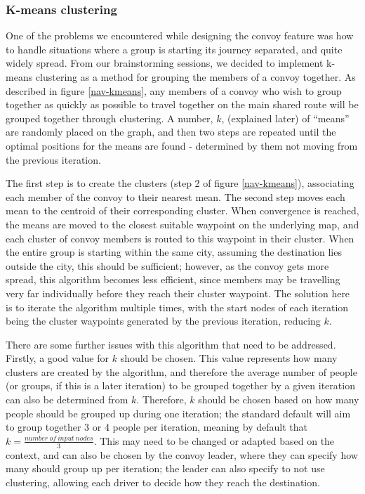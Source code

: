 \documentclass{article}
\begin{document}
\subsubsection{K-means clustering}\label{sssec:nav-tech-kmeans}
One of the problems we encountered while designing the convoy feature was how to handle situations where a group is starting its journey separated, and quite widely spread. From our brainstorming sessions, we decided to implement k-means clustering as a method for grouping the members of a convoy together. As described in figure \ref{nav-kmeans}, any members of a convoy who wish to group together as quickly as possible to travel together on the main shared route will be grouped together through clustering. A number, $k$, (explained later) of ``means'' are randomly placed on the graph, and then two steps are repeated until the optimal positions for the means are found - determined by them not moving from the previous iteration. 

The first step is to create the clusters (step 2 of figure \ref{nav-kmeans}), associating each member of the convoy to their nearest mean. The second step moves each mean to the centroid of their corresponding cluster. When convergence is reached, the means are moved to the closest suitable waypoint on the underlying map, and each cluster of convoy members is routed to this waypoint in their cluster. When the entire group is starting within the same city, assuming the destination lies outside the city, this should be sufficient; however, as the convoy gets more spread, this algorithm becomes less efficient, since members may be travelling very far individually before they reach their cluster waypoint. The solution here is to iterate the algorithm multiple times, with the start nodes of each iteration being the cluster waypoints generated by the previous iteration, reducing $k$.

There are some further issues with this algorithm that need to be addressed. Firstly, a good value for $k$ should be chosen. This value represents how many clusters are created by the algorithm, and therefore the average number of people (or groups, if this is a later iteration) to be grouped together by a given iteration can also be determined from $k$. Therefore, $k$ should be chosen based on how many people should be grouped up during one iteration; the standard default will aim to group together 3 or 4
%
%
people per iteration, meaning by default that $k=\frac{number\ of\ input\ nodes}{3}$. This may need to be changed or adapted based on the context, and can also be chosen by the convoy leader, where they can specify how many should group up per iteration; the leader can also specify to not use clustering, allowing each driver to decide how they reach the destination.
\end{document}

